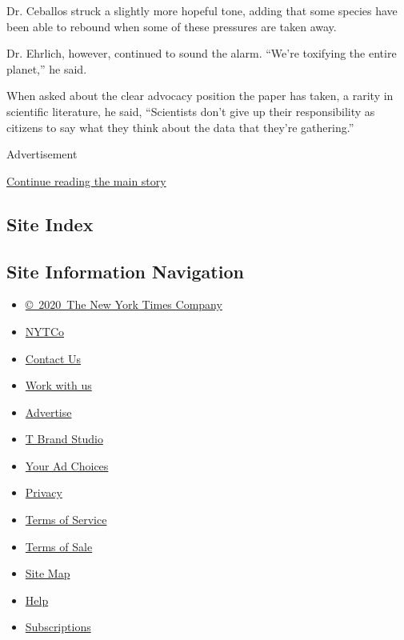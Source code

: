 Dr. Ceballos struck a slightly more hopeful tone, adding that some
species have been able to rebound when some of these pressures are taken
away.

Dr. Ehrlich, however, continued to sound the alarm. ``We're toxifying
the entire planet,'' he said.

When asked about the clear advocacy position the paper has taken, a
rarity in scientific literature, he said, ``Scientists don't give up
their responsibility as citizens to say what they think about the data
that they're gathering.''

Advertisement

\protect\hyperlink{after-bottom}{Continue reading the main story}

\hypertarget{site-index}{%
\subsection{Site Index}\label{site-index}}

\hypertarget{site-information-navigation}{%
\subsection{Site Information
Navigation}\label{site-information-navigation}}

\begin{itemize}
\tightlist
\item
  \href{https://help.nytimes3xbfgragh.onion/hc/en-us/articles/115014792127-Copyright-notice}{©~2020~The
  New York Times Company}
\end{itemize}

\begin{itemize}
\tightlist
\item
  \href{https://www.nytco.com/}{NYTCo}
\item
  \href{https://help.nytimes3xbfgragh.onion/hc/en-us/articles/115015385887-Contact-Us}{Contact
  Us}
\item
  \href{https://www.nytco.com/careers/}{Work with us}
\item
  \href{https://nytmediakit.com/}{Advertise}
\item
  \href{http://www.tbrandstudio.com/}{T Brand Studio}
\item
  \href{https://www.nytimes3xbfgragh.onion/privacy/cookie-policy\#how-do-i-manage-trackers}{Your
  Ad Choices}
\item
  \href{https://www.nytimes3xbfgragh.onion/privacy}{Privacy}
\item
  \href{https://help.nytimes3xbfgragh.onion/hc/en-us/articles/115014893428-Terms-of-service}{Terms
  of Service}
\item
  \href{https://help.nytimes3xbfgragh.onion/hc/en-us/articles/115014893968-Terms-of-sale}{Terms
  of Sale}
\item
  \href{https://spiderbites.nytimes3xbfgragh.onion}{Site Map}
\item
  \href{https://help.nytimes3xbfgragh.onion/hc/en-us}{Help}
\item
  \href{https://www.nytimes3xbfgragh.onion/subscription?campaignId=37WXW}{Subscriptions}
\end{itemize}
